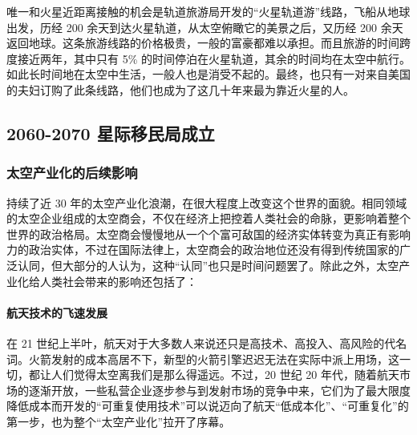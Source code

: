 \documentclass[letterpaper,10pt]{sphinxmanual}
\begin{document}
唯一和火星近距离接触的机会是轨道旅游局开发的“火星轨道游”线路，飞船从地球出发，历经 200 余天到达火星轨道，从太空俯瞰它的美景之后，又历经 200 余天返回地球。这条旅游线路的价格极贵，一般的富豪都难以承担。而且旅游的时间跨度接近两年，其中只有 5\% 的时间停泊在火星轨道，其余的时间均在太空中航行。如此长时间地在太空中生活，一般人也是消受不起的。最终，也只有一对来自美国的夫妇订购了此条线路，他们也成为了这几十年来最为靠近火星的人。


\subsection{2060-2070 星际移民局成立}
\label{history:id10}

\subsubsection{太空产业化的后续影响}
\label{history:id11}
持续了近 30 年的太空产业化浪潮，在很大程度上改变这个世界的面貌。相同领域的太空企业组成的太空商会，不仅在经济上把控着人类社会的命脉，更影响着整个世界的政治格局。太空商会慢慢地从一个个富可敌国的经济实体转变为真正有影响力的政治实体，不过在国际法律上，太空商会的政治地位还没有得到传统国家的广泛认同，但大部分的人认为，这种“认同”也只是时间问题罢了。除此之外，太空产业化给人类社会带来的影响还包括了：


\paragraph{航天技术的飞速发展}
\label{history:id12}
在 21 世纪上半叶，航天对于大多数人来说还只是高技术、高投入、高风险的代名词。火箭发射的成本高居不下，新型的火箭引擎迟迟无法在实际中派上用场，这一切，都让人们觉得太空离我们是那么得遥远。不过，20 世纪 20 年代，随着航天市场的逐渐开放，一些私营企业逐步参与到发射市场的竞争中来，它们为了最大限度降低成本而开发的“可重复使用技术”可以说迈向了航天“低成本化”、“可重复化”的第一步，也为整个“太空产业化”拉开了序幕。
\end{document}
